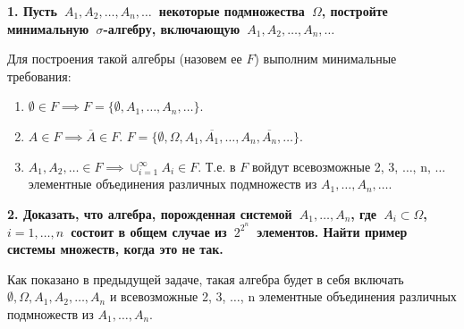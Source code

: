 \documentclass{article}
\begin{document}
\noindent \textbf{1. Пусть $A_1, A_2, \dots, A_n, \dots$ некоторые подмножества $\Omega$, постройте минимальную $\sigma$-алгебру, включающую $A_1, A_2, …, A_n, …$}

Для построения такой алгебры (назовем ее $F$) выполним минимальные требования:

\begin{enumerate}
\item $\emptyset \in F \implies F = \{\emptyset, A_1, \dots, A_n, \dots\}$. 

\item $A \in F \implies \overline{A} \in F$. $F = \{\emptyset, \Omega, A_1, \overline{A_1}, \dots, A_n, \overline{A_n}, \dots\}$. 

\item $A_1, A_2, \dots \in F \implies \cup_{i=1}^{\infty}A_i \in F$. Т.е. в $F$ войдут всевозможные 2, 3, $\dots$, n, $\dots$ элементные объединения различных подмножеств из $A_1, \dots, A_n, \dots$.
\end{enumerate}

\noindent \textbf{2. Доказать, что алгебра, порожденная системой $A_1, \dots, A_n$, где $A_i \subset \Omega$,  $i=1,\dots,n$ состоит в общем случае из $2^{2^n}$ элементов. Найти пример системы множеств, когда это не так.}

Как показано в предыдущей задаче, такая алгебра будет в себя включать $\emptyset, \Omega, A_1, A_2, \dots, A_n$ и всевозможные 2, 3, $\dots$, n элементные объединения различных подмножеств из $A_1, \dots, A_n$. 
\end{document}
